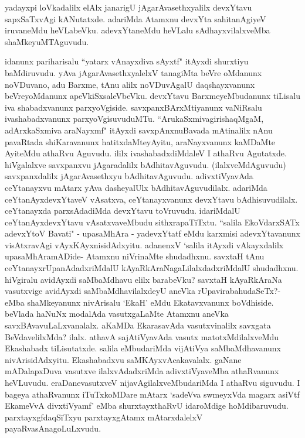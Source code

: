 
\begin{artha}
yadayxpi loVkadalilx elAlx janarigU jAgarAvasethxyalilx devxYtavu sapxSaTxvAgi kANutatxde. adariMda Atamxnu devxYta sahitanAgiyeV iruvaneMdu heVLabeVku. adevxYtaneMdu heVLalu sAdhayxvilalxveMba shaMkeyuMTAguvudu.
\end{artha}

\begin{artha}
idanunx pariharisalu ``yatarx vAnayxdiva sAyxtf" itAyxdi shurxtiyu baMdiruvudu. yAva jAgarAvasethxyalelxV tanagiMta beVre oMdanunx noVDuvano, adu Barxme, tAnu alilx noVDuvAgalU daqshayxvanunx beVreyoMdanunx apeVkiSxsaleVbeVku. devxYtavu BarxmeyeMbudanunx tiLisalu iva shabadxvanunx parxyoVgiside. savxpanxBArxMtiyanunx vaNiRsalu ivashabadxvanunx parxyoVgisuvuduMTu. ``ArukaSxmivagirishaqMgaM, adArxkaSxmiva araNayxmf" itAyxdi savxpAnxnuBavada mAtinalilx nAnu pavaRtada shiKaravanunx hatitxdaMteyAyitu, araNayxvanunx kaMDaMte AyiteMdu athaRvu Aguvudu. ililx ivashabadxdiMdaleV I athaRvu Agutatxde. hiVgalalxve savxpanxvu jAgaradalilx bAdhitavAguvudu. (ilalxveMdAguvudu) savxpanxdalilx jAgarAvasethxyu bAdhitavAguvudu. adivxtiVyavAda ceYtanayxvu mAtarx yAva dasheyalUlx bAdhitavAguvudilalx. adariMda ceYtanAyxdevxYtaveV vAsatxva, ceYtanayxvanunx devxYtavu bAdhisuvudilalx. ceYtanayxda parxsAdadiMda devxYtavu toVruvudu. idariMdalU ceYtanAyxdevxYtavu vAsatxvaveMbudu sithxrapaTiTxtu. ``salila EkoVdarxSATx adevxYtoV Bavati" - upasaMhAra - yadevxYtatf  eMdu karxmisi adevxYtavanunx visAtxravAgi vAyxKAyxnisidAdxyitu. adanenxV `salila itAyxdi vAkayxdalilx upasaMhAramADide- Atamxnu niVrinaMte shudadhxnu. savxtaH tAnu ceYtanayxrUpanAdadxriMdalU kAyaRkAraNagaLilalxdadxriMdalU shudadhxnu. hiVgiralu avidAyxdi saMbaMdhavu elilx barabeVku? savxtaH kAyaRkAraNa vasutxvige avidAyxdi saMbaMdhavilalxdeyU aneVka rUpavirabahudaSeTx?- eMba shaMkeyanunx nivArisalu `EkaH' eMdu Ekatavxvanunx boVdhiside. beVlada haNuNx modalAda vasutxgaLaMte Atamxnu aneVka savxBAvavuLaLxvanalalx. aKaMDa EkarasavAda vasutxvinalilx savxgata BeVdavelilxMda? ilalx. athavA sajAtiVyavAda vasutx matotxMdilalxveMdu Ekashabadx tiLisutatxde. salila eMbudariMda vijAtiVya saMbaMdhavanunx nivArisidAdxyitu. Ekashabadxvu saMKAyxvAcakavalalx. gaNane mADalapxDuva vasutxve ilalxvAdadxriMda adivxtiVyaveMba athaRvanunx heVLuvudu. eraDanevasutxveV nijavAgilalxveMbudariMda I athaRvu siguvudu. I bageya athaRvanunx iTuTxkoMDare mAtarx `sadeVva swmeyxVda magarx asiVtf EkameVvA divxtiVyamf' eMba shurxtayxthaRvU idaroMdige hoMdibaruvudu. parxtayxgfdaqSiTxyu parxtayxgAtamx mAtarxdalelxV payaRvasAnagoLuLxvudu.
\end{artha}%

